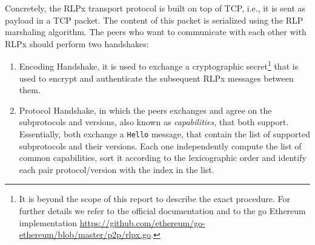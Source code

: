 Concretely, the RLPx transport protocol is built on top of TCP, i.e., it is
sent as payload in a TCP packet. The content of this packet is serialized using 
the RLP marshaling algorithm. The peers who want to communicate with each other 
with RLPx should perform two handshakes:
\begin{enumerate}
    \item Encoding Handshake, it is used to exchange a cryptographic 
    secret\footnote{It is beyond the scope of this report to describe the exact 
    procedure. For further details we refer to the official documentation 
    \cite{rlpx} and to the go Ethereum implementation 
    \url{https://github.com/ethereum/go-ethereum/blob/master/p2p/rlpx.go}.}
    that is used to encrypt and authenticate the subsequent RLPx messages 
    between them.
    \item Protocol Handshake, in which the peers exchanges and agree on the 
    subprotocols and versions, also known as \emph{capabilities}, that both
    support. Essentially, both exchange a \texttt{Hello} message, that contain
    the list of supported subprotocols and their versions. Each one
    independently compute the list of common capabilities, sort it  according 
    to the lexicographic order and identify each pair 
    protocol/version with the index in the list.
\end{enumerate}

